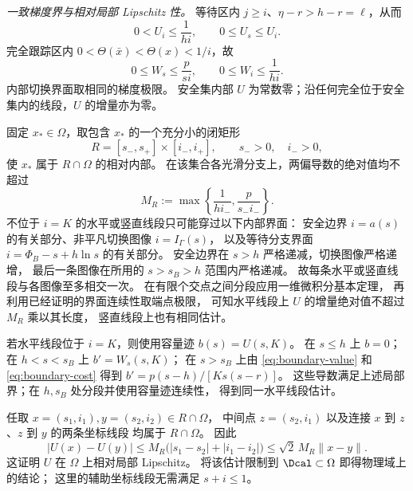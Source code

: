 \emph{一致梯度界与相对局部 Lipschitz 性。}
等待区内 $j\ge i$、$\eta-r>h-r=\ell$，从而
\[
0<U_i\le\frac{1}{hi},\qquad 0\le U_s\le U_i.
\]
完全跟踪区内 $0<\Theta(\bar x)<\Theta(x)<1/i$，故
\[
0\le W_s\le\frac{p}{si},\qquad 0\le W_i\le\frac{1}{hi}.
\]
内部切换界面取相同的梯度极限。
安全集内部 $U$ 为常数零；沿任何完全位于安全集内的线段，$U$ 的增量亦为零。

固定 $x_*\in\Omega$，取包含 $x_*$ 的一个充分小的闭矩形
\[
R=[s_-,s_+]\times[i_-,i_+],\qquad s_->0,\quad i_->0,
\]
使 $x_*$ 属于 $R\cap\Omega$ 的相对内部。
在该集合各光滑分支上，两偏导数的绝对值均不超过
\[
M_R:=\max\left\{\frac{1}{hi_-},\frac{p}{s_-i_-}\right\}.
\]
不位于 $i=K$ 的水平或竖直线段只可能穿过以下内部界面：
安全边界 $i=a(s)$ 的有关部分、非平凡切换图像 $i=I_\Gamma(s)$，
以及等待分支界面 $i=\Phi_B-s+h\ln s$ 的有关部分。
安全边界在 $s>h$ 严格递减，切换图像严格递增，
最后一条图像在所用的 $s>s_B>h$ 范围内严格递减。
故每条水平或竖直线段与各图像至多相交一次。
在有限个交点之间分段应用一维微积分基本定理，
再利用已经证明的界面连续性取端点极限，
可知水平线段上 $U$ 的增量绝对值不超过 $M_R$ 乘以其长度，
竖直线段上也有相同估计。

若水平线段位于 $i=K$，则使用容量迹 $b(s)=U(s,K)$。
在 $s\le h$ 上 $b=0$；在 $h<s<s_B$ 上 $b'=W_s(s,K)$；
在 $s>s_B$ 上由 \eqref{eq:boundary-value} 和 \eqref{eq:boundary-cost}
得到 $b'=p(s-h)/[Ks(s-r)]$。
这些导数满足上述局部界；在 $h,s_B$ 处分段并使用容量迹连续性，
得到同一水平线段估计。

任取 $x=(s_1,i_1),y=(s_2,i_2)\in R\cap\Omega$，
中间点 $z=(s_2,i_1)$ 以及连接 $x$ 到 $z$、$z$ 到 $y$ 的两条坐标线段
均属于 $R\cap\Omega$。
因此
\[
|U(x)-U(y)|
\le M_R\bigl(|s_1-s_2|+|i_1-i_2|\bigr)
\le\sqrt{2}\,M_R\lVert x-y\rVert.
\]
这证明 $U$ 在 $\Omega$ 上相对局部 Lipschitz。
将该估计限制到 $\Dcal\subset\Omega$ 即得物理域上的结论；
这里的辅助坐标线段无需满足 $s+i\le1$。
